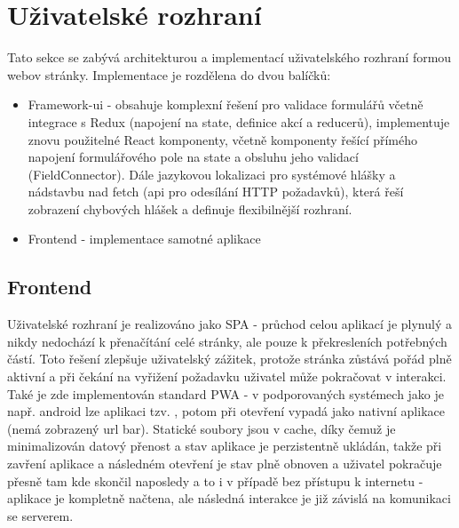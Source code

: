 \section{Uživatelské rozhraní}
Tato sekce se zabývá architekturou a implementací uživatelského rozhraní formou webov stránky. Implementace je rozdělena do dvou balíčků:
\begin{itemize}
    \item Framework-ui - obsahuje komplexní řešení pro validace formulářů včetně integrace s Redux (napojení na state, definice akcí a reducerů), implementuje znovu použitelné React komponenty, včetně komponenty řešící přímého napojení formulářového pole na state a obsluhu jeho validací (FieldConnector). Dále jazykovou lokalizaci pro systémové hlášky a nádstavbu nad fetch (api pro odesílání HTTP požadavků), která řeší zobrazení chybových hlášek a definuje flexibilnější rozhraní.
    \item Frontend - implementace samotné aplikace
\end{itemize}

\subsection{Frontend}
Uživatelské rozhraní je realizováno jako SPA - průchod celou aplikací je plynulý a nikdy nedochází k přenačítání celé stránky, ale pouze k překresleních potřebných částí. Toto řešení zlepšuje uživatelský zážitek, protože stránka zůstává pořád plně aktivní a při čekání na vyřižení požadavku uživatel může pokračovat v interakci. Také je zde implementován standard PWA - v podporovaných systémech jako je např. android lze aplikaci tzv. , potom při otevření vypadá jako nativní aplikace (nemá zobrazený url bar). Statické soubory jsou v cache, díky čemuž je minimalizován datový přenost a stav aplikace je perzistentně ukládán, takže při zavření aplikace a následném otevření je stav plně obnoven a uživatel pokračuje přesně tam kde skončil naposledy a to i v případě bez přístupu k internetu - aplikace je kompletně načtena, ale následná interakce je již závislá na komunikaci se serverem.

